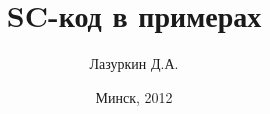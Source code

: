 \documentclass[hyperref={pdftex,unicode}]{beamer}
\begin{document}
\title{SC-код в примерах}  
\author{Лазуркин Д.А.}
\date{Минск, 2012} 

\begin{frame}
  \maketitle{}
\end{frame}




\end{document}
